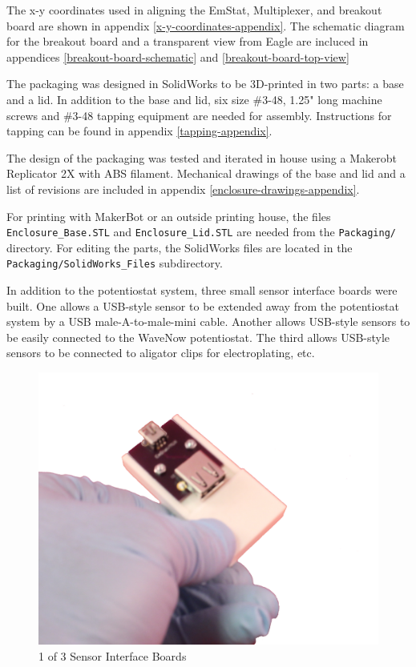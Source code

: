 \documentclass[DIV=calc, paper=letterpaper, fontsize=11pt, twocolumn]{scrartcl}	 %
\begin{document}
The x-y coordinates used in aligning the EmStat, Multiplexer, and breakout board are shown in appendix \ref{x-y-coordinates-appendix}.
The schematic diagram for the breakout board and a transparent view from Eagle are incluced in appendices \ref{breakout-board-schematic} and \ref{breakout-board-top-view}

The packaging was designed in SolidWorks to be 3D-printed in two parts: a base and a lid.
In addition to the base and lid, six size \#3-48, 1.25" long machine screws and \#3-48 tapping equipment are needed for assembly.
Instructions for tapping can be found in appendix \ref{tapping-appendix}.

\begin{table}[ht]
\centering
\caption{Assembly Components}
\label{breakout-board-bom}
\end{table}

The design of the packaging was tested and iterated in house using a Makerobt Replicator 2X with ABS filament.
Mechanical drawings of the base and lid and a list of revisions are included in appendix \ref{enclosure-drawings-appendix}.

For printing with MakerBot or an outside printing house,
the files \texttt{Enclosure\_Base.STL} and \texttt{Enclosure\_Lid.STL} are needed from the \texttt{Packaging/} directory.
For editing the parts, the SolidWorks files are located in the \texttt{Packaging/SolidWorks\_Files} subdirectory.

In addition to the potentiostat system, three small sensor interface boards were built.
One allows a USB-style sensor to be extended away from the potentiostat system by a USB male-A-to-male-mini cable.
Another allows USB-style sensors to be easily connected to the WaveNow potentiostat.
The third allows USB-style sensors to be connected to aligator clips for electroplating, etc.

\begin{figure}[ht]
\centering
\includegraphics[width=0.4\columnwidth]{interface-board}
\caption{1 of 3 Sensor Interface Boards}
\end{figure}
\end{document}
